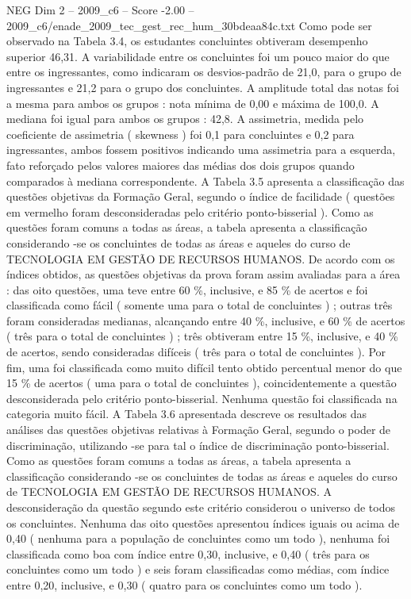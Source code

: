 \begin{textsample}{NEG Dim 2 – 2009\_c6 – Score -2.00 – 2009\_c6/enade\_2009\_tec\_gest\_rec\_hum\_30bdeaa84c.txt}
Como pode ser observado na Tabela 3.4, os estudantes concluintes obtiveram desempenho superior 46,31.
A variabilidade entre os concluintes foi um pouco maior do que entre os ingressantes, como indicaram os desvios-padrão de 21,0, para o grupo de ingressantes e 21,2 para o grupo dos concluintes.
A amplitude total das notas foi a mesma para ambos os grupos : nota mínima de 0,00 e máxima de 100,0.
A mediana foi igual para ambos os grupos : 42,8.
A assimetria, medida pelo coeficiente de assimetria ( skewness ) foi 0,1 para concluintes e 0,2 para ingressantes, ambos fossem positivos indicando uma assimetria para a esquerda, fato reforçado pelos valores maiores das médias dos dois grupos quando comparados à mediana correspondente.
A Tabela 3.5 apresenta a classificação das questões objetivas da Formação Geral, segundo o índice de facilidade ( questões em vermelho foram desconsideradas pelo critério ponto-bisserial ).
Como as questões foram comuns a todas as áreas, a tabela apresenta a classificação considerando -se os concluintes de todas as áreas e aqueles do curso de TECNOLOGIA EM GESTÃO DE RECURSOS HUMANOS.
De acordo com os índices obtidos, as questões objetivas da prova foram assim avaliadas para a área : das oito questões, uma teve entre 60 \%, inclusive, e 85 \% de acertos e foi classificada como fácil ( somente uma para o total de concluintes ) ; outras três foram consideradas medianas, alcançando entre 40 \%, inclusive, e 60 \% de acertos ( três para o total de concluintes ) ; três obtiveram entre 15 \%, inclusive, e 40 \% de acertos, sendo consideradas difíceis ( três para o total de concluintes ).
Por fim, uma foi classificada como muito difícil tento obtido percentual menor do que 15 \% de acertos ( uma para o total de concluintes ), coincidentemente a questão desconsiderada pelo critério ponto-bisserial.
Nenhuma questão foi classificada na categoria muito fácil.
A Tabela 3.6 apresentada descreve os resultados das análises das questões objetivas relativas à Formação Geral, segundo o poder de discriminação, utilizando -se para tal o índice de discriminação ponto-bisserial.
Como as questões foram comuns a todas as áreas, a tabela apresenta a classificação considerando -se os concluintes de todas as áreas e aqueles do curso de TECNOLOGIA EM GESTÃO DE RECURSOS HUMANOS.
A desconsideração da questão segundo este critério considerou o universo de todos os concluintes.
Nenhuma das oito questões apresentou índices iguais ou acima de 0,40 ( nenhuma para a população de concluintes como um todo ), nenhuma foi classificada como boa com índice entre 0,30, inclusive, e 0,40 ( três para os concluintes como um todo ) e seis foram classificadas como médias, com índice entre 0,20, inclusive, e 0,30 ( quatro para os concluintes como um todo ).

\end{textsample}
